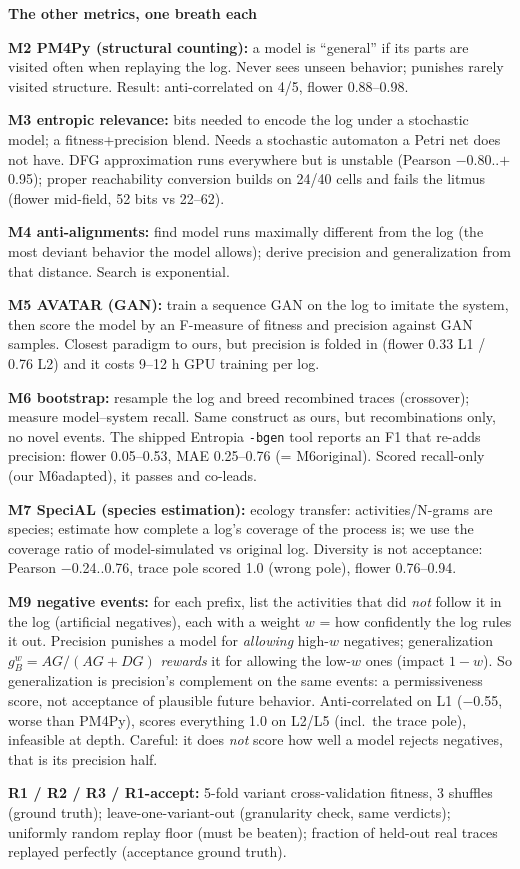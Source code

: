 \documentclass[10pt]{article}
\newcommand{\hdr}[1]{\vspace{5pt}\noindent\textcolor{hd}{\textbf{\large #1}}\par\vspace{2pt}}
\newcommand{\kv}[2]{\noindent\textbf{#1} #2\par}
\begin{document}
\hdr{The other metrics, one breath each}
\kv{M2 PM4Py (structural counting):}{a model is ``general'' if its parts are visited often when replaying the log. Never sees unseen behavior; punishes rarely visited structure. Result: anti-correlated on 4/5, flower 0.88--0.98.}
\kv{M3 entropic relevance:}{bits needed to encode the log under a stochastic model; a fitness+precision blend. Needs a stochastic automaton a Petri net does not have. DFG approximation runs everywhere but is unstable (Pearson $-$0.80..$+$0.95); proper reachability conversion builds on 24/40 cells and fails the litmus (flower mid-field, 52 bits vs 22--62).}
\kv{M4 anti-alignments:}{find model runs maximally different from the log (the most deviant behavior the model allows); derive precision and generalization from that distance. Search is exponential.}
\kv{M5 AVATAR (GAN):}{train a sequence GAN on the log to imitate the system, then score the model by an F-measure of fitness and precision against GAN samples. Closest paradigm to ours, but precision is folded in (flower 0.33 L1 / 0.76 L2) and it costs 9--12 h GPU training per log.}
\kv{M6 bootstrap:}{resample the log and breed recombined traces (crossover); measure model--system recall. Same construct as ours, but recombinations only, no novel events. The shipped Entropia \texttt{-bgen} tool reports an F1 that re-adds precision: flower 0.05--0.53, MAE 0.25--0.76 (= M6original). Scored recall-only (our M6adapted), it passes and co-leads.}
\kv{M7 SpeciAL (species estimation):}{ecology transfer: activities/N-grams are species; estimate how complete a log's coverage of the process is; we use the coverage ratio of model-simulated vs original log. Diversity is not acceptance: Pearson $-$0.24..0.76, trace pole scored 1.0 (wrong pole), flower 0.76--0.94.}
\kv{M9 negative events:}{for each prefix, list the activities that did \emph{not} follow it in the log (artificial negatives), each with a weight $w$ = how confidently the log rules it out. Precision punishes a model for \emph{allowing} high-$w$ negatives; generalization $g^w_B = AG/(AG{+}DG)$ \emph{rewards} it for allowing the low-$w$ ones (impact $1-w$). So generalization is precision's complement on the same events: a permissiveness score, not acceptance of plausible future behavior. Anti-correlated on L1 ($-$0.55, worse than PM4Py), scores everything 1.0 on L2/L5 (incl.\ the trace pole), infeasible at depth. Careful: it does \emph{not} score how well a model rejects negatives, that is its precision half.}
\kv{R1 / R2 / R3 / R1-accept:}{5-fold variant cross-validation fitness, 3 shuffles (ground truth); leave-one-variant-out (granularity check, same verdicts); uniformly random replay floor (must be beaten); fraction of held-out real traces replayed perfectly (acceptance ground truth).}
\end{document}

